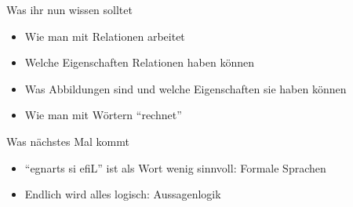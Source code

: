 



\begin{frame}	
	\begin{block}{Was ihr nun wissen solltet}
		\begin{itemize}
			\item Wie man mit Relationen arbeitet
			\item Welche Eigenschaften Relationen haben können
			\item Was Abbildungen sind und welche Eigenschaften sie haben können
			\item Wie man mit Wörtern \enquote{rechnet}
		\end{itemize}
	\end{block}
	
	\begin{block}{Was nächstes Mal kommt}
		\begin{itemize}
			\item \enquote{egnarts si efiL} ist als Wort wenig sinnvoll: Formale Sprachen
			\item Endlich wird alles logisch: Aussagenlogik
		\end{itemize}
	\end{block}
\end{frame}


\slideThanks

